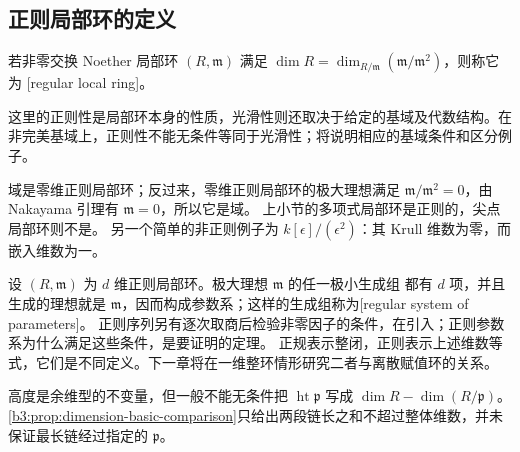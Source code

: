 \subsection{正则局部环的定义}
\label{b3:subsec:0904:03}

\begin{definition}\label{b3:def:regular-local-ring}
	若非零交换 Noether 局部环 \((R,\mathfrak m)\) 满足 \(\dim R=\dim_{R/\mathfrak m}(\mathfrak m/\mathfrak m^2)\)，则称它为 [regular local ring]。
\end{definition}

这里的正则性是局部环本身的性质，光滑性则还取决于给定的基域及代数结构。在非完美基域上，正则性不能无条件等同于光滑性；将说明相应的基域条件和区分例子。

域是零维正则局部环；反过来，零维正则局部环的极大理想满足 \(\mathfrak m/\mathfrak m^2=0\)，由 Nakayama 引理有 \(\mathfrak m=0\)，所以它是域。 上小节的多项式局部环是正则的，尖点局部环则不是。 另一个简单的非正则例子为 \(k[\epsilon]/(\epsilon^2)\)：其 Krull 维数为零，而嵌入维数为一。

\ProseParagraphBreak
设 \((R,\mathfrak m)\) 为 \(d\) 维正则局部环。极大理想 \(\mathfrak m\) 的任一极小生成组 都有 \(d\) 项，并且生成的理想就是 \(\mathfrak m\)，因而构成参数系；这样的生成组称为[regular system of parameters]。 正则序列另有逐次取商后检验非零因子的条件，在引入；正则参数系为什么满足这些条件，是要证明的定理。 正规表示整闭，正则表示上述维数等式，它们是不同定义。下一章将在一维整环情形研究二者与离散赋值环的关系。

高度是余维型的不变量，但一般不能无条件把 \(\operatorname{ht}\mathfrak p\) 写成 \(\dim R-\dim(R/\mathfrak p)\)。\cref{b3:prop:dimension-basic-comparison}只给出两段链长之和不超过整体维数，并未保证最长链经过指定的 \(\mathfrak p\)。

